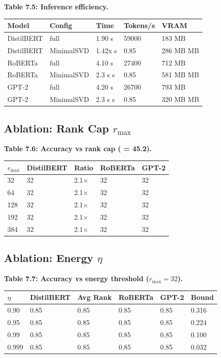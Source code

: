 \textbf{Table 7.5: Inference efficiency.}

\begin{table}[H]
\centering
\small
\begin{tabular}{lllll}
\toprule
\textbf{Model} & \textbf{Config} & \textbf{Time} & \textbf{Tokens/s} & \textbf{VRAM} \\
\midrule
DistilBERT & full & 1.90 s & 59000 & 183 MB \\
DistilBERT & MinimalSVD & 1.42x s & 0.85 & 286 MB MB \\
RoBERTa & full & 4.10 s & 27400 & 712 MB \\
RoBERTa & MinimalSVD & 2.3 s s & 0.85 & 581 MB MB \\
GPT-2 & full & 4.20 s & 26700 & 793 MB \\
GPT-2 & MinimalSVD & 2.3 s s & 0.85 & 320 MB MB \\
\bottomrule
\end{tabular}
\end{table}

\subsection{Ablation: Rank Cap $r_\text{max}$}

\textbf{Table 7.6: Accuracy vs rank cap (  = 45.2).}

\begin{table}[H]
\centering
\small
\begin{tabular}{lllll}
\toprule
\textbf{$r_\text{max}$} & \textbf{DistilBERT} & \textbf{Ratio} & \textbf{RoBERTa} & \textbf{GPT-2} \\
\midrule
32 & 32 & 2.1$\times$ & 32 & 32 \\
64 & 32 & 2.1$\times$ & 32 & 32 \\
128 & 32 & 2.1$\times$ & 32 & 32 \\
192 & 32 & 2.1$\times$ & 32 & 32 \\
384 & 32 & 2.1$\times$ & 32 & 32 \\
\bottomrule
\end{tabular}
\end{table}

\subsection{Ablation: Energy $\eta$}

\textbf{Table 7.7: Accuracy vs energy threshold ($r_\text{max} = 32$).}

\begin{table}[H]
\centering
\small
\begin{tabular}{llllll}
\toprule
\textbf{$\eta$} & \textbf{DistilBERT} & \textbf{Avg Rank} & \textbf{RoBERTa} & \textbf{GPT-2} & \textbf{Bound} \\
\midrule
0.90 & 0.85 & 0.85 & 0.85 & 0.85 & 0.316 \\
0.95 & 0.85 & 0.85 & 0.85 & 0.85 & 0.224 \\
0.99 & 0.85 & 0.85 & 0.85 & 0.85 & 0.100 \\
0.999 & 0.85 & 0.85 & 0.85 & 0.85 & 0.032 \\
\bottomrule
\end{tabular}
\end{table}

